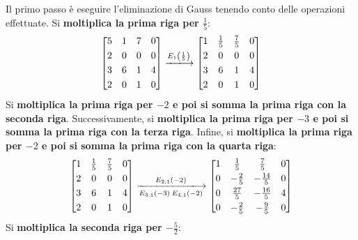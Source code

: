 \documentclass[a4paper]{article}
\makeatletter
\newenvironment{rowequmatbra}[1]{\left[\array{@{}#1@{}}}{\endarray\right]}
\makeatother
\begin{document}
	\noindent
	Il \textcolor{Red3}{primo passo} è eseguire l'eliminazione di Gauss tenendo conto delle operazioni effettuate. Si \textbf{moltiplica la prima riga per $\frac{1}{5}$}:
	\begin{equation*}
		\begin{rowequmatbra}{cccc}
			5	&  1	& 7		& 0 \\ [0.3em]
			2 	&  0	& 0 	& 0 \\ [0.3em]
			3	&  6	& 1 	& 4 \\ [0.3em]
			2	&  0	& 1		& 0
		\end{rowequmatbra} \xlongrightarrow{E_{1}\left(\frac{1}{5}\right)}
		\begin{rowequmatbra}{cccc}
			1	&  \frac{1}{5}	& \frac{7}{5}	& 0 \\ [0.3em]
			2 	&  0			& 0 			& 0 \\ [0.3em]
			3	&  6			& 1 			& 4 \\ [0.3em]
			2	&  0			& 1				& 0
		\end{rowequmatbra}
	\end{equation*}
	Si \textbf{moltiplica la prima riga per $-2$ e poi si somma la prima riga con la seconda riga}. Successivamente, si \textbf{moltiplica la prima riga per $-3$ e poi si somma la prima riga con la terza riga}. Infine, si \textbf{moltiplica la prima riga per $-2$ e poi si somma la prima riga con la quarta riga}:
	\begin{equation*}
		\begin{rowequmatbra}{cccc}
			1	&  \frac{1}{5}	& \frac{7}{5}	& 0 \\ [0.3em]
			2 	&  0			& 0 			& 0 \\ [0.3em]
			3	&  6			& 1 			& 4 \\ [0.3em]
			2	&  0			& 1				& 0
		\end{rowequmatbra} \xlongrightarrow[E_{3,1}\left(-3\right) \: E_{4,1}\left(-2\right)]{E_{2,1}\left(-2\right)}
		\begin{rowequmatbra}{cccc}
			1	&  \frac{1}{5}	& \frac{7}{5}	& 0 \\ [0.3em]
			0 	&  -\frac{2}{5}	& -\frac{14}{5}	& 0 \\ [0.3em]
			0	&  \frac{27}{5}	& -\frac{16}{5}	& 4 \\ [0.3em]
			0	&  -\frac{2}{5}	& -\frac{9}{5}	& 0
		\end{rowequmatbra}
	\end{equation*}
	Si \textbf{moltiplica la seconda riga per $-\frac{5}{2}$}:
\end{document}
